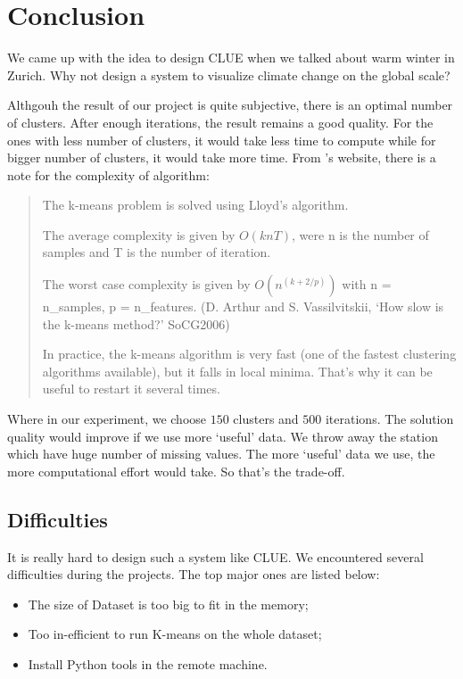 \section{Conclusion}

We came up with the idea to design CLUE when we talked about warm winter in Zurich. Why not design a system to visualize climate change on the global scale?  

Althgouh the result of our project is quite subjective, there is an optimal number of clusters. After enough iterations, the result remains a good quality. For the ones with less number of clusters, it would take less time to compute while for bigger number of clusters, it would take more time. From \cite{sklearn}'s website, there is a note for the complexity of algorithm:
\begin{quote}
The k-means problem is solved using Lloyd’s algorithm.

The average complexity is given by $O(k n T)$, were n is the number of samples and T is the number of iteration.

The worst case complexity is given by $O(n^{(k+2/p)})$ with n = n\_samples, p = n\_features. (D. Arthur and S. Vassilvitskii, `How slow is the k-means method?' SoCG2006)

In practice, the k-means algorithm is very fast (one of the fastest clustering algorithms available), but it falls in local minima. That’s why it can be useful to restart it several times.
\end{quote}
Where in our experiment, we choose $150$ clusters and $500$ iterations. The solution quality would improve if we use more `useful' data. We throw away the station which have huge number of missing values. The more `useful' data we use, the more computational effort would take. So that's the trade-off.

\subsection{Difficulties}
It is really hard to design such a system like CLUE. We encountered several difficulties during the projects. The top major ones are listed below:
\begin{itemize}
    \item The size of Dataset is too big to fit in the memory;
    \item Too in-efficient to run K-means on the whole dataset;
    \item Install Python tools in the remote machine.
\end{itemize}

